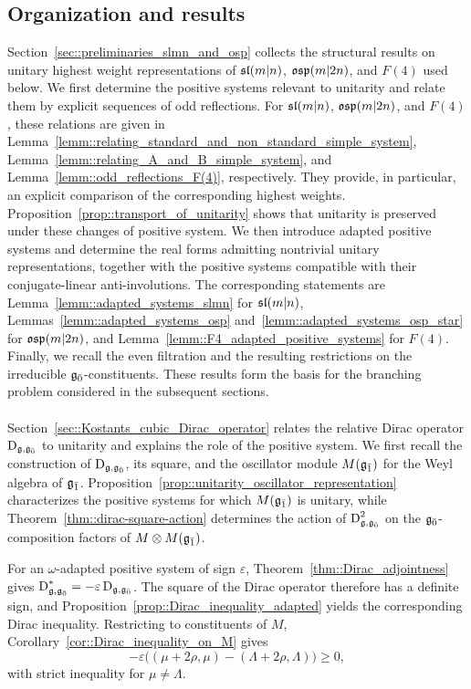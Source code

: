\subsection{Organization and results} Section~\ref{sec::preliminaries_slmn_and_osp} collects the structural results on unitary highest weight representations of $\sl(m\vert n)$, $\osp(m\vert2n)$, and $F(4)$ used below. We first determine the positive systems relevant to unitarity and relate them by explicit sequences of odd reflections. For $\sl(m\vert n)$, $\osp(m\vert2n)$, and $F(4)$, these relations are given in Lemma~\ref{lemm::relating_standard_and_non_standard_simple_system}, Lemma~\ref{lemm::relating_A_and_B_simple_system}, and Lemma~\ref{lemm::odd_reflections_F(4)}, respectively. They provide, in particular, an explicit comparison of the corresponding highest weights. Proposition~\ref{prop::transport_of_unitarity} shows that unitarity is preserved under these changes of positive system. We then introduce adapted positive systems and determine the real forms admitting nontrivial unitary representations, together with the positive systems compatible with their conjugate-linear anti-involutions. The corresponding statements are Lemma~\ref{lemm::adapted_systems_slmn} for $\sl(m\vert n)$, Lemmas~\ref{lemm::adapted_systems_osp} and~\ref{lemm::adapted_systems_osp_star} for $\osp(m\vert2n)$, and Lemma~\ref{lemm::F4_adapted_positive_systems} for $F(4)$. Finally, we recall the even filtration and the resulting restrictions on the irreducible $\even$-constituents. These results form the basis for the branching problem considered in the subsequent sections.
\\
\\
Section~\ref{sec::Kostants_cubic_Dirac_operator} relates the relative Dirac operator $\Dirac_{\gg,\even}$ to unitarity and explains the role of the positive system. We first recall the construction of $\Dirac_{\gg,\even}$, its square, and the oscillator module $M(\odd)$ for the Weyl algebra of $\odd$. Proposition~\ref{prop::unitarity_oscillator_representation} characterizes the positive systems for which $M(\odd)$ is unitary, while Theorem~\ref{thm::dirac-square-action} determines the action of $\Dirac_{\gg,\even}^{2}$ on the $\even$-composition factors of $M\otimes M(\odd)$.

For an $\omega$-adapted positive system of sign $\varepsilon$, Theorem~\ref{thm::Dirac_adjointness} gives
$\Dirac_{\gg,\even}^{\ast}=-\varepsilon\Dirac_{\gg,\even}$.
The square of the Dirac operator therefore has a definite sign, and Proposition~\ref{prop::Dirac_inequality_adapted} yields the corresponding Dirac inequality. Restricting to constituents of $M$, Corollary~\ref{cor::Dirac_inequality_on_M} gives
\begin{equation}
-\varepsilon\bigl((\mu+2\rho,\mu)-(\Lambda+2\rho,\Lambda)\bigr)\geq0,
\end{equation}
with strict inequality for $\mu\neq\Lambda$.


